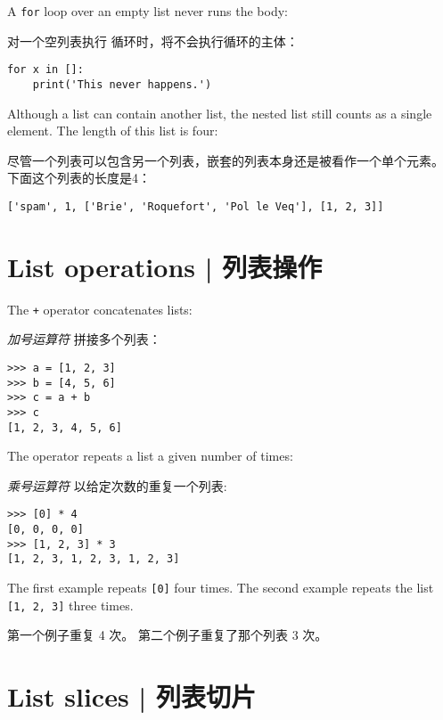 A {\tt for} loop over an empty list never runs the body:

对一个空列表执行  循环时，将不会执行循环的主体：

\begin{lstlisting}
for x in []:
    print('This never happens.')
\end{lstlisting}

%
Although a list can contain another list, the nested
list still counts as a single element.  The length of this list is
four:

尽管一个列表可以包含另一个列表，嵌套的列表本身还是被看作一个单个元素。
下面这个列表的长度是4：
  

\begin{lstlisting}
['spam', 1, ['Brie', 'Roquefort', 'Pol le Veq'], [1, 2, 3]]
\end{lstlisting}


\section{List operations  |  列表操作}

The {\tt +} operator concatenates lists:

{\em 加号运算符}\li{+} 拼接多个列表：

  

\begin{lstlisting}
>>> a = [1, 2, 3]
>>> b = [4, 5, 6]
>>> c = a + b
>>> c
[1, 2, 3, 4, 5, 6]
\end{lstlisting}

%
The {\tt *} operator repeats a list a given number of times:

{\em 乘号运算符} \li{*} 以给定次数的重复一个列表:
  

\begin{lstlisting}
>>> [0] * 4
[0, 0, 0, 0]
>>> [1, 2, 3] * 3
[1, 2, 3, 1, 2, 3, 1, 2, 3]
\end{lstlisting}

%
The first example repeats {\tt [0]} four times.  The second example
repeats the list {\tt [1, 2, 3]} three times.

第一个例子重复 4 次。 第二个例子重复了那个列表 3 次。

\section{List slices  |  列表切片}
    
  

